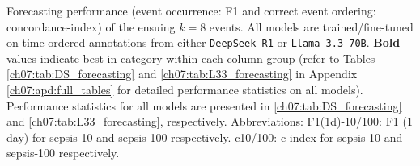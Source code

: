 \begin{table}[htbp]
\caption{Forecasting performance (event occurrence: F1 and correct event ordering: concordance-index) of the ensuing $k=8$ events. All models are trained/fine-tuned on time-ordered annotations from either \texttt{DeepSeek-R1} or \texttt{Llama 3.3-70B}. \textbf{Bold} values indicate best in category within each column group (refer to Tables \ref{ch07:tab:DS_forecasting} and \ref{ch07:tab:L33_forecasting} in Appendix \ref{ch07:apd:full_tables} for detailed performance statistics on all models). Performance statistics for all models are presented in \ref{ch07:tab:DS_forecasting} and \ref{ch07:tab:L33_forecasting}, respectively. Abbreviations: F1(1d)-10/100: F1 (1 day) for sepsis-10 and sepsis-100 respectively. c10/100: c-index for sepsis-10 and sepsis-100 respectively.
}
\ChSevenTableBodyStart
\begin{ChSevenFloatBody}


\end{ChSevenFloatBody}
\end{table}
